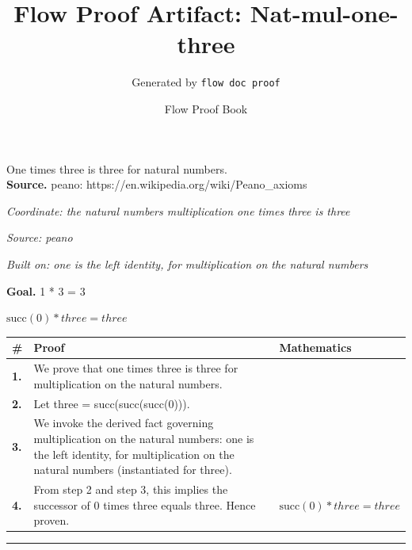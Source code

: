 \documentclass[11pt]{article}
\title{Flow Proof Artifact: Nat-mul-one-three}
\author{Generated by \texttt{flow doc proof}}
\date{Flow Proof Book}
\theoremstyle{definition}
\begin{document}
\maketitle
One times three is three for natural numbers.\\[0.5em]
\textbf{Source.} peano: https://en.wikipedia.org/wiki/Peano\_axioms\\[0.5em]
\bigskip
{}\par
\smallskip\noindent\textit{Coordinate: the natural numbers \cdot multiplication \cdot one times three is three}\par
\smallskip\noindent\textit{Source: peano}\par
\smallskip\noindent\textit{Built on: one is the left identity, for multiplication on the natural numbers}\par
\medskip
\noindent\textbf{Goal.} 1 * 3 = 3\par
\noindent$\displaystyle \mathrm{succ}(0) * three = three$\par
\medskip
\noindent
\begin{tabular}{@{} >{\raggedright\arraybackslash}p{} >{\raggedright\arraybackslash}p{} >{\raggedleft\arraybackslash}p{} @{}}
\textbf{\#} & \textbf{Proof} & \textbf{Mathematics} \\
\midrule
\textbf{1.} & We prove that one times three is three for multiplication on the natural numbers. & \\[0.45em]
\textbf{2.} & Let three = succ(succ(succ(0))). & \\[0.45em]
\textbf{3.} & We invoke the derived fact governing multiplication on the natural numbers: one is the left identity, for multiplication on the natural numbers (instantiated for three). & \\[0.45em]
\textbf{4.} & From step 2 and step 3, this implies the successor of 0 times three equals three. Hence proven. & $\displaystyle \mathrm{succ}(0) * three = three$ \\[0.45em]
\bottomrule
\end{tabular}
\label{thm:Nat-multiplication-one_times_three_is_three}
\par\medskip\hrule
\end{document}

